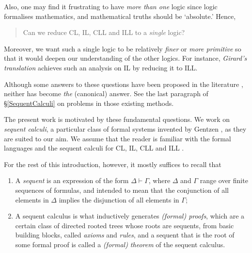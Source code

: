 \documentclass[a4paper]{article}
\theoremstyle{definition}
\theoremstyle{theorem}
\theoremstyle{remark}
\begin{document}
Also, one may find it frustrating to have \emph{more than one} logic since logic formalises mathematics, and mathematical truths should be `absolute.'
Hence,
\begin{quote}
Can we reduce CL, IL, CLL and ILL to a \emph{single} logic?
\end{quote}
Moreover, we want such a single logic to be relatively \emph{finer} or \emph{more primitive} so that it would deepen our understanding of the other logics.
For instance, \emph{Girard's translation} \cite{girard1987linear} achieves such an analysis on IL by reducing it to ILL.

Although some answers to these questions have been proposed in the literature \cite{troelstra2000basic,girard1987linear,girard1993unity}, neither has become \emph{the} (canonical) answer.
See the last paragraph of \S\ref{SequentCalculi} on problems in those existing methods.
\fi

The present work is motivated by these fundamental questions.
We work on \emph{sequent calculi}, a particular class of formal systems invented by Gentzen \cite{gentzen1935untersuchungen}, as they are suited to our aim.
We assume that the reader is familiar with the formal languages and the sequent calculi for CL, IL, CLL and ILL \cite{troelstra2000basic,girard1995linear}.

For the rest of this introduction, however, it mostly suffices to recall that
\begin{enumerate}

\item A \emph{sequent} is an expression of the form $\Delta \vdash \Gamma$, where $\Delta$ and $\Gamma$ range over finite sequences of formulas, and intended to mean that the conjunction of all elements in $\Delta$ implies the disjunction of all elements in $\Gamma$;

\item A sequent calculus is what inductively generates \emph{(formal) proofs}, which are a certain class of directed rooted trees whose roots are sequents, from basic building blocks, called \emph{axioms} and \emph{rules}, and a sequent that is the root of some formal proof is called a \emph{(formal) theorem} of the sequent calculus.

\end{enumerate}
\fi
\end{document}
